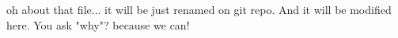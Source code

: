 oh
about that file...
it will be just renamed on git repo.
And it will be modified here.
You ask "why"?
because we can!
